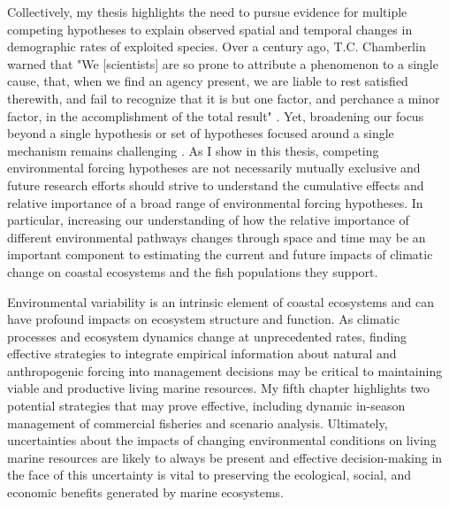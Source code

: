 Collectively, my thesis highlights the need to pursue evidence for multiple
competing hypotheses to explain observed spatial and temporal changes in
demographic rates of exploited species. Over a century ago, T.C. Chamberlin
warned that "We [scientists] are so prone to attribute a phenomenon to a single
cause, that, when we find an agency present, we are liable to rest satisfied
therewith, and fail to recognize that it is but one factor, and perchance a
minor factor, in the accomplishment of the total result" \citep{Chamberlin1965}.
Yet, broadening our focus beyond a single hypothesis or set of hypotheses
focused around a single mechanism remains challenging \citep{Hare2014}. As I
show in this thesis, competing environmental forcing hypotheses are not
necessarily mutually exclusive and future research efforts should strive to
understand the cumulative effects and relative importance of a broad range of
environmental forcing hypotheses. In particular, increasing our understanding of
how the relative importance of different environmental pathways changes through
space and time may be an important component to estimating the current and
future impacts of climatic change on coastal ecosystems and the fish populations
they support.

Environmental variability is an intrinsic element of coastal ecosystems and can
have profound impacts on ecosystem structure and function. As climatic processes
and ecosystem dynamics change at unprecedented rates, finding effective
strategies to integrate empirical information about natural and anthropogenic
forcing into management decisions may be critical to maintaining viable and
productive living marine resources. My fifth chapter highlights two potential
strategies that may prove effective, including dynamic in-season management of
commercial fisheries and scenario analysis. Ultimately, uncertainties about the
impacts of changing environmental conditions on living marine resources are
likely to always be present and effective decision-making in the face of this
uncertainty is vital to preserving the ecological, social, and economic benefits
generated by marine ecosystems.


